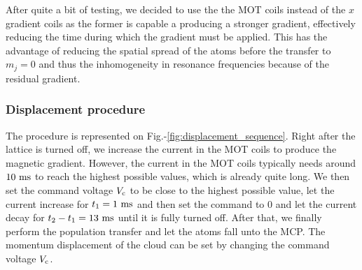 After quite a bit of testing, we decided to use the the MOT coils instead of the $x$ gradient coils as the former is capable a producing a stronger gradient, effectively reducing the time during which the gradient must be applied. This has the advantage of reducing the spatial spread of the atoms before the transfer to $m_j=0$ and thus the inhomogeneity in resonance frequencies because of the residual gradient.  

\subsubsection{Displacement procedure}

The procedure is represented on Fig.-\ref{fig:displacement_sequence}. Right after the lattice is turned off, we increase the current in the MOT coils to produce the magnetic gradient. However, the current in the MOT coils typically needs around $10 \ \rm{ms}$ to reach the highest possible values, which is already quite long. We then set the command voltage $V_{\rm{c}}$ to be close to the highest possible value, let the current increase for $t_1 = 1 \ \rm{ms}$ and then set the command to $0$ and let the current decay for $t_2-t_1=13 \ \rm{ms}$ until it is fully turned off. After that, we finally perform the population transfer and let the atoms fall unto the MCP. The momentum displacement of the cloud can be set by changing the command voltage $V_{\rm{c}}$.


